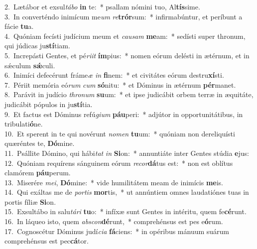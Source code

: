 {2.~}Lætábor et exsul\textit{tá}\textit{bo} \textbf{in} te:~* psallam nómini tuo, Al\textbf{tís}sime.\\
{3.~}In converténdo inimícum me\textit{um} \textit{re}\textbf{trór}sum:~* infirmabúntur, et períbunt a fácie \textbf{tu}a.\\
{4.~}Quóniam fecísti judícium meum et \textit{cau}\textit{sam} \textbf{me}am:~* sedísti super thronum, qui júdicas ju\textbf{stí}tiam.\\
{5.~}Increpásti Gentes, et pé\textit{ri}\textit{it} \textbf{ím}pius:~* nomen eórum delésti in ætérnum, et in sǽculum \textbf{sǽ}culi.\\
{6.~}Inimíci defecérunt fráme\textit{æ} \textit{in} \textbf{fi}nem:~* et civitátes eórum destru\textbf{xí}sti.\\
{7.~}Périit memória eó\textit{rum} \textit{cum} \textbf{só}nitu:~* et Dóminus in ætérnum \textbf{pér}manet.\\
{8.~}Parávit in judício \textit{thro}\textit{num} \textbf{su}um:~* et ipse judicábit orbem terræ in æquitáte, judicábit pópulos in ju\textbf{stí}tia.\\
{9.~}Et factus est Dóminus refú\textit{gi}\textit{um} \textbf{páu}peri:~* adjútor in opportunitátibus, in tribulati\textbf{ó}ne.\\
{10.~}Et sperent in te qui novérunt \textit{no}\textit{men} \textbf{tu}um:~* quóniam non dereliquísti quæréntes te, \textbf{Dó}mine.\\
{11.~}Psállite Dómino, qui hábi\textit{tat} \textit{in} \textbf{Si}on:~* annuntiáte inter Gentes stúdia \textbf{e}jus:\\
{12.~}Quóniam requírens sánguinem eórum \textit{re}\textit{cor}\textbf{dá}tus est:~* non est oblítus clamórem \textbf{páu}perum.\\
{13.~}Miserére \textit{me}\textit{i}, \textbf{Dó}mine:~* vide humilitátem meam de inimícis \textbf{me}is.\\
{14.~}Qui exáltas me de \textit{por}\textit{tis} \textbf{mor}tis,~* ut annúntiem omnes laudatiónes tuas in portis fíliæ \textbf{Si}on.\\
{15.~}Exsultábo in salu\textit{tá}\textit{ri} \textbf{tu}o:~* infíxæ sunt Gentes in intéritu, quem fe\textbf{cé}runt.\\
{16.~}In láqueo isto, quem \textit{ab}\textit{scon}\textbf{dé}runt,~* comprehénsus est pes e\textbf{ó}rum.\\
{17.~}Cognoscétur Dóminus judí\textit{ci}\textit{a} \textbf{fá}ciens:~* in opéribus mánuum suárum comprehénsus est pec\textbf{cá}tor.\\
